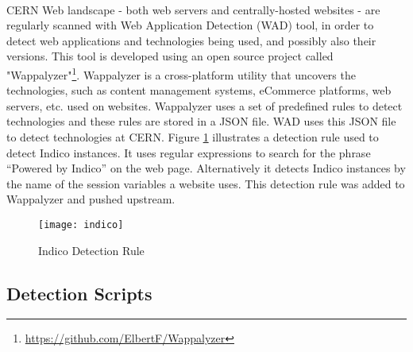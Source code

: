 \paragraph{}
CERN Web landscape - both web servers and centrally-hosted websites - are regularly scanned with Web Application Detection (WAD) tool, in order to detect web applications and technologies being used, and possibly also their versions. This tool is developed using an open source project called "Wappalyzer"\footnote{\url{https://github.com/ElbertF/Wappalyzer}}. Wappalyzer is a cross-platform utility that uncovers the technologies, such as content management systems, eCommerce platforms, web servers, etc. used on websites.  Wappalyzer uses a set of predefined rules to detect technologies and these rules are stored in a JSON file. WAD uses this JSON file to detect technologies at CERN. Figure \ref{figure:indico} illustrates a detection rule used to detect Indico instances. It uses regular expressions to search for the phrase ``Powered by Indico'' on the web page. Alternatively it detects Indico instances by the name of the session variables a website uses. This detection rule was added to Wappalyzer and pushed upstream.
\begin{figure}[h!]
\label{figure:indico}
  \centering
    \texttt{[image: indico]}
  \caption{Indico Detection Rule}
  
\end{figure}
 
\subsection{Detection Scripts}
